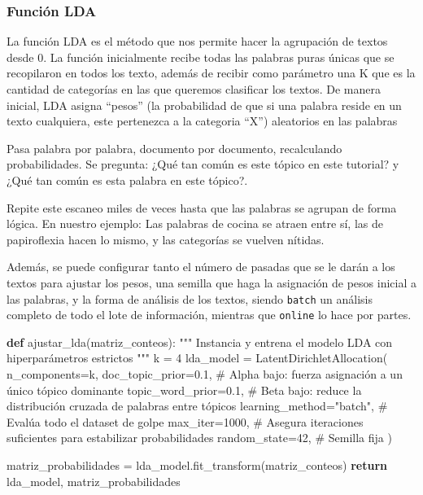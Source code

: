 \documentclass[
  spanish,
  letterpaper,
  DIV=11,
  numbers=noendperiod]{scrartcl}
\newenvironment{Shaded}{\begin{snugshade}}{\end{snugshade}}
\newcommand{\CommentTok}[1]{\textcolor[rgb]{0.37,0.37,0.37}{#1}}
\newcommand{\ControlFlowTok}[1]{\textcolor[rgb]{0.00,0.23,0.31}{\textbf{#1}}}
\newcommand{\DecValTok}[1]{\textcolor[rgb]{0.68,0.00,0.00}{#1}}
\newcommand{\FloatTok}[1]{\textcolor[rgb]{0.68,0.00,0.00}{#1}}
\newcommand{\KeywordTok}[1]{\textcolor[rgb]{0.00,0.23,0.31}{\textbf{#1}}}
\newcommand{\NormalTok}[1]{\textcolor[rgb]{0.00,0.23,0.31}{#1}}
\newcommand{\OperatorTok}[1]{\textcolor[rgb]{0.37,0.37,0.37}{#1}}
\newcommand{\StringTok}[1]{\textcolor[rgb]{0.13,0.47,0.30}{#1}}
\begin{document}
\subsubsection{Función LDA}\label{funciuxf3n-lda}

La función LDA es el método que nos permite hacer la agrupación de
textos desde 0. La función inicialmente recibe todas las palabras puras
únicas que se recopilaron en todos los texto, además de recibir como
parámetro una K que es la cantidad de categorías en las que queremos
clasificar los textos. De manera inicial, LDA asigna ``pesos'' (la
probabilidad de que si una palabra reside en un texto cualquiera, este
pertenezca a la categoria ``X'') aleatorios en las palabras

Pasa palabra por palabra, documento por documento, recalculando
probabilidades. Se pregunta: ¿Qué tan común es este tópico en este
tutorial? y ¿Qué tan común es esta palabra en este tópico?.

Repite este escaneo miles de veces hasta que las palabras se agrupan de
forma lógica. En nuestro ejemplo: Las palabras de cocina se atraen entre
sí, las de papiroflexia hacen lo mismo, y las categorías se vuelven
nítidas.

Además, se puede configurar tanto el número de pasadas que se le darán a
los textos para ajustar los pesos, una semilla que haga la asignación de
pesos inicial a las palabras, y la forma de análisis de los textos,
siendo \texttt{batch} un análisis completo de todo el lote de
información, mientras que \texttt{online} lo hace por partes.

\begin{Shaded}
\begin{Highlighting}[]


\KeywordTok{def}\NormalTok{ ajustar\_lda(matriz\_conteos):}
    \CommentTok{"""}
\CommentTok{    Instancia y entrena el modelo LDA con hiperparámetros estrictos}
\CommentTok{    """}
\NormalTok{    k }\OperatorTok{=} \DecValTok{4}
\NormalTok{    lda\_model }\OperatorTok{=}\NormalTok{ LatentDirichletAllocation(}
\NormalTok{        n\_components}\OperatorTok{=}\NormalTok{k,}
\NormalTok{        doc\_topic\_prior}\OperatorTok{=}\FloatTok{0.1}\NormalTok{,      }\CommentTok{\# Alpha bajo: fuerza asignación a un único tópico dominante}
\NormalTok{        topic\_word\_prior}\OperatorTok{=}\FloatTok{0.1}\NormalTok{,     }\CommentTok{\# Beta bajo: reduce la distribución cruzada de palabras entre tópicos}
\NormalTok{        learning\_method}\OperatorTok{=}\StringTok{"batch"}\NormalTok{,  }\CommentTok{\# Evalúa todo el dataset de golpe }
\NormalTok{        max\_iter}\OperatorTok{=}\DecValTok{1000}\NormalTok{,            }\CommentTok{\# Asegura iteraciones suficientes para estabilizar probabilidades}
\NormalTok{        random\_state}\OperatorTok{=}\DecValTok{42}\NormalTok{,          }\CommentTok{\# Semilla fija}
\NormalTok{    )}
    
\NormalTok{    matriz\_probabilidades }\OperatorTok{=}\NormalTok{ lda\_model.fit\_transform(matriz\_conteos)}
    \ControlFlowTok{return}\NormalTok{ lda\_model, matriz\_probabilidades}
\end{Highlighting}
\end{Shaded}
\end{document}
